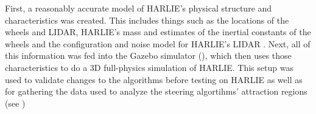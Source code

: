 First, a reasonably accurate model of HARLIE's physical structure and characteristics was created. This includes things such as the locations of the wheels and LIDAR, HARLIE's mass and estimates of the inertial constants of the wheels and the configuration and noise model for HARLIE's LIDAR . Next, all of this information was fed into the Gazebo simulator (), which then uses those characteristics to do a 3D full-physics simulation of HARLIE. This setup was used to validate changes to the algorithms before testing on HARLIE as well as for gathering the data used to analyze the steering algortihms' attraction regions (see )

